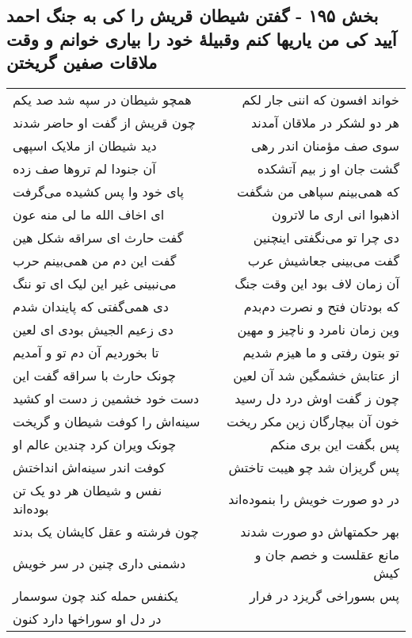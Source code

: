 \begin{center}
\section*{بخش ۱۹۵ - گفتن شیطان قریش را کی به جنگ احمد آیید کی من یاریها کنم وقبیلهٔ خود را بیاری خوانم و وقت ملاقات صفین گریختن}
\label{sec:sh195}
\begin{longtable}{l p{0.5cm} r}
همچو شیطان در سپه شد صد یکم
&&
خواند افسون که اننی جار لکم
\\
چون قریش از گفت او حاضر شدند
&&
هر دو لشکر در ملاقان آمدند
\\
دید شیطان از ملایک اسپهی
&&
سوی صف مؤمنان اندر رهی
\\
آن جنودا لم تروها صف زده
&&
گشت جان او ز بیم آتشکده
\\
پای خود وا پس کشیده می‌گرفت
&&
که همی‌بینم سپاهی من شگفت
\\
ای اخاف الله ما لی منه عون
&&
اذهبوا انی اری ما لاترون
\\
گفت حارث ای سراقه شکل هین
&&
دی چرا تو می‌نگفتی اینچنین
\\
گفت این دم من همی‌بینم حرب
&&
گفت می‌بینی جعاشیش عرب
\\
می‌نبینی غیر این لیک ای تو ننگ
&&
آن زمان لاف بود این وقت جنگ
\\
دی همی‌گفتی که پایندان شدم
&&
که بودتان فتح و نصرت دم‌بدم
\\
دی زعیم الجیش بودی ای لعین
&&
وین زمان نامرد و ناچیز و مهین
\\
تا بخوردیم آن دم تو و آمدیم
&&
تو بتون رفتی و ما هیزم شدیم
\\
چونک حارث با سراقه گفت این
&&
از عتابش خشمگین شد آن لعین
\\
دست خود خشمین ز دست او کشید
&&
چون ز گفت اوش درد دل رسید
\\
سینه‌اش را کوفت شیطان و گریخت
&&
خون آن بیچارگان زین مکر ریخت
\\
چونک ویران کرد چندین عالم او
&&
پس بگفت این بری منکم
\\
کوفت اندر سینه‌اش انداختش
&&
پس گریزان شد چو هیبت تاختش
\\
نفس و شیطان هر دو یک تن بوده‌اند
&&
در دو صورت خویش را بنموده‌اند
\\
چون فرشته و عقل کایشان یک بدند
&&
بهر حکمتهاش دو صورت شدند
\\
دشمنی داری چنین در سر خویش
&&
مانع عقلست و خصم جان و کیش
\\
یکنفس حمله کند چون سوسمار
&&
پس بسوراخی گریزد در فرار
\\
در دل او سوراخها دارد کنون

\end{longtable}
\end{center}
